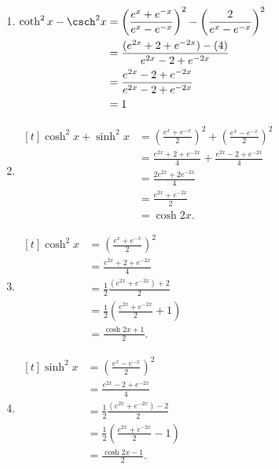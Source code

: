 \begin{enumialphparenastyle}
\begin{ex}
\begin{enumerate}
\end{enumerate}
	\begin{sol}
		\begin{enumerate}
		\item {\hfill$\begin{aligned}[t]
				\coth^2x-\csch^2x &= \left(\frac{e^x+e^{-x}}{e^x-e^{-x}}\right)^2 - \left(\frac{2}{e^x-e^{-x}}\right)^2 \\
													&= \frac{(e^{2x} + 2 + e^{-2x}) - (4)}{e^{2x} - 2 + e^{-2x}}\\
													&= \frac{e^{2x} - 2 + e^{-2x}}{e^{2x} - 2 + e^{-2x}}\\
													&= 1										
		\end{aligned}$\hfill\null}
		\item {\hfill$\begin{aligned}[t]
				\cosh^2x+\sinh^2x &= \left(\frac{e^x+e^{-x}}{2}\right)^2 + \left(\frac{e^x-e^{-x}}{2}\right)^2 \\
													&= \frac{e^{2x} + 2 + e^{-2x}}{4} + \frac{e^{2x} - 2 + e^{-2x}}{4}\\
													&= \frac{2e^{2x}  + 2e^{-2x}}{4}\\
													&= \frac{e^{2x} + e^{-2x}}{2} \\
													&= \cosh 2x.			
		\end{aligned}$\hfill\null}
		\item {\hfill$\begin{aligned}[t]
				\cosh^2x &= \left(\frac{e^x+e^{-x}}{2}\right)^2  \\
													&= \frac{e^{2x} + 2 + e^{-2x}}{4} \\
													&= \frac12\frac{(e^{2x}  + e^{-2x})+2}{2}\\
													&= \frac12\left(\frac{e^{2x}  + e^{-2x}}{2}+1\right)\\
													&= \frac{\cosh2x+1}{2}.			
		\end{aligned}$\hfill\null}
		\item {\hfill$\begin{aligned}[t]
				\sinh^2x &= \left(\frac{e^x-e^{-x}}{2}\right)^2  \\
													&= \frac{e^{2x} - 2 + e^{-2x}}{4} \\
													&= \frac12\frac{(e^{2x}  + e^{-2x})-2}{2}\\
													&= \frac12\left(\frac{e^{2x}  + e^{-2x}}{2}-1\right)\\
													&= \frac{\cosh2x-1}{2}.			
		\end{aligned}$\hfill\null}
		\end{enumerate}
	\end{sol}
\end{ex}


\end{enumialphparenastyle}
